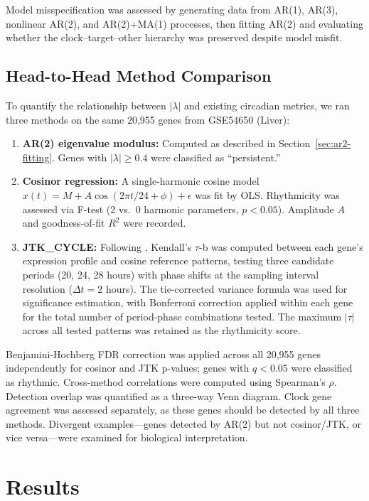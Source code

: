 \documentclass[11pt,letterpaper]{article}
\begin{document}
Model misspecification was assessed by generating data from AR(1), AR(3), nonlinear AR(2), and AR(2)+MA(1) processes, then fitting AR(2) and evaluating whether the clock--target--other hierarchy was preserved despite model misfit.

\subsection{Head-to-Head Method Comparison} \label{sec:headtohead-methods}

To quantify the relationship between $|\lambda|$ and existing circadian metrics, we ran three methods on the same 20,955 genes from GSE54650 (Liver):

\begin{enumerate}
\item \textbf{AR(2) eigenvalue modulus:} Computed as described in Section~\ref{sec:ar2-fitting}. Genes with $|\lambda| \geq 0.4$ were classified as ``persistent.''
\item \textbf{Cosinor regression:} A single-harmonic cosine model $x(t) = M + A\cos(2\pi t/24 + \phi) + \epsilon$ was fit by OLS. Rhythmicity was assessed via F-test (2 vs.\ 0 harmonic parameters, $p < 0.05$). Amplitude $A$ and goodness-of-fit $R^2$ were recorded.
\item \textbf{JTK\_CYCLE:} Following \citet{hughes2010jtk}, Kendall's $\tau$-b was computed between each gene's expression profile and cosine reference patterns, testing three candidate periods (20, 24, 28 hours) with phase shifts at the sampling interval resolution ($\Delta t = 2$ hours). The tie-corrected variance formula was used for significance estimation, with Bonferroni correction applied within each gene for the total number of period-phase combinations tested. The maximum $|\tau|$ across all tested patterns was retained as the rhythmicity score.
\end{enumerate}

Benjamini-Hochberg FDR correction \citep{benjamini1995controlling} was applied across all 20,955 genes independently for cosinor and JTK p-values; genes with $q < 0.05$ were classified as rhythmic. Cross-method correlations were computed using Spearman's $\rho$. Detection overlap was quantified as a three-way Venn diagram. Clock gene agreement was assessed separately, as these genes should be detected by all three methods. Divergent examples---genes detected by AR(2) but not cosinor/JTK, or vice versa---were examined for biological interpretation.

\section{Results}
\end{document}
